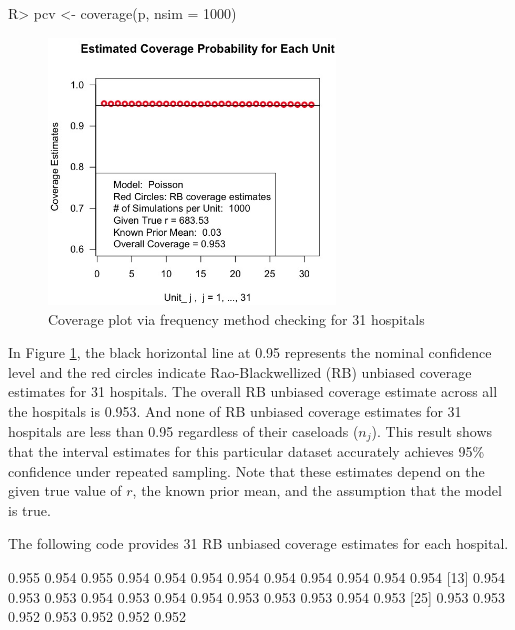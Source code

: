 \documentclass[article]{jss}
\begin{document}
\begin{CodeChunk}
\begin{CodeInput}
R> pcv <- coverage(p, nsim = 1000)
\end{CodeInput}
\end{CodeChunk}
\begin{figure}[h] 
\begin{center}
\includegraphics[width = 3in]{hospital2.png}
\caption{Coverage plot via frequency method checking for 31 hospitals}
\label{fig:hospitalcoverage}
\end{center}
\end{figure}

In Figure \ref{fig:hospitalcoverage}, the black horizontal line at 0.95 represents the nominal confidence level and the red circles indicate Rao-Blackwellized (RB) unbiased coverage estimates for 31 hospitals. The overall RB unbiased coverage estimate across all the hospitals is 0.953. And none of RB unbiased coverage estimates for 31 hospitals are less than 0.95 regardless of their caseloads ($n_{j}$). This result shows that the interval estimates for this particular dataset accurately achieves 95\% confidence under repeated sampling. Note that these estimates depend on the given true value of $r$, the known prior mean, and the assumption that the model is true.

The following code provides 31 RB unbiased coverage estimates for each hospital.
\begin{CodeChunk}
\begin{CodeOutput}
 [1] 0.955 0.954 0.955 0.954 0.954 0.954 0.954 0.954 0.954 0.954 0.954 0.954
[13] 0.954 0.953 0.953 0.954 0.953 0.954 0.954 0.953 0.953 0.953 0.954 0.953
[25] 0.953 0.953 0.952 0.953 0.952 0.952 0.952
\end{CodeOutput}
\end{CodeChunk}
\end{document}
